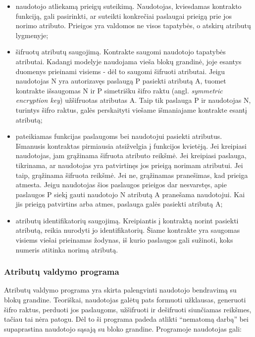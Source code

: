 \begin{itemize}
    \item naudotojo atliekamą prieigų suteikimą. Naudotojas, kviesdamas kontrakto funkciją, gali pasirinkti,
    ar suteikti konkrečiai paslaugai prieigą prie jos norimo atributo. Prieigos yra valdomos ne visos tapatybės, o
    atskirų atributų lygmenyje;

    \item šifruotų atributų saugojimą. Kontrakte saugomi naudotojo tapatybės atributai. Kadangi modelyje naudojama vieša blokų
    grandinė, joje esantys duomenys prieinami visiems - dėl to saugomi šifruoti atributai. Jeigu naudotojas N
    yra autorizavęs paslaugą P pasiekti atributą A, tuomet kontrakte išsaugomas N ir P simetrišku šifro raktu (angl.
    \textit{symmetric encryption key}) užšifruotas atributas A. Taip tik paslauga P
    ir naudotojas N, turintys šifro raktus, galės perskaityti viešame išmaniajame kontrakte esantį atributą;

    \item pateikiamas funkcijas paslaugoms bei naudotojui pasiekti atributus. Išmanusis kontraktas pirmiausia atsižvelgia
    į funkcijos kvietėją. Jei kreipiasi naudotojas, jam grąžinama šifruota atributo reikšmė. Jei kreipiasi paslauga, tikrinama,
    ar naudotojas yra patvirtinęs jos prieigą norimam atributui. Jei taip, grąžinama šifruota reikšmė. Jei ne, grąžinamas pranešimas,
    kad prieiga atmesta. Jeigu naudotojas šios paslaugos prieigos dar nesvarstęs, apie paslaugos P siekį gauti naudotojo N atributą A
    pranešama naudotojui. Kai jis prieigą patvirtins arba atmes, paslauga galės pasiekti atributą A;

    \item atributų identifikatorių saugojimą. Kreipiantis į kontraktą norint pasiekti atributą, reikia nurodyti jo identifikatorių.
    Šiame kontrakte yra saugomas visiems viešai prieinamas žodynas, iš kurio paslaugos gali sužinoti, koks numeris atitinka norimą
    atributą.
\end{itemize}

\subsubsection{Atributų valdymo programa}

Atributų valdymo programa yra skirta palengvinti naudotojo bendravimą su blokų grandine. Teoriškai, naudotojas galėtų pats formuoti užklausas,
generuoti šifro raktus, perduoti jos paslaugoms, užšifruoti ir dešifruoti siunčiamas reikšmes, tačiau tai nėra patogu. Dėl to ši
programa padeda atlikti \enquote{nematomą darbą} bei supaprastina naudotojo sąsają su bloko grandine. Programoje naudotojas gali:

